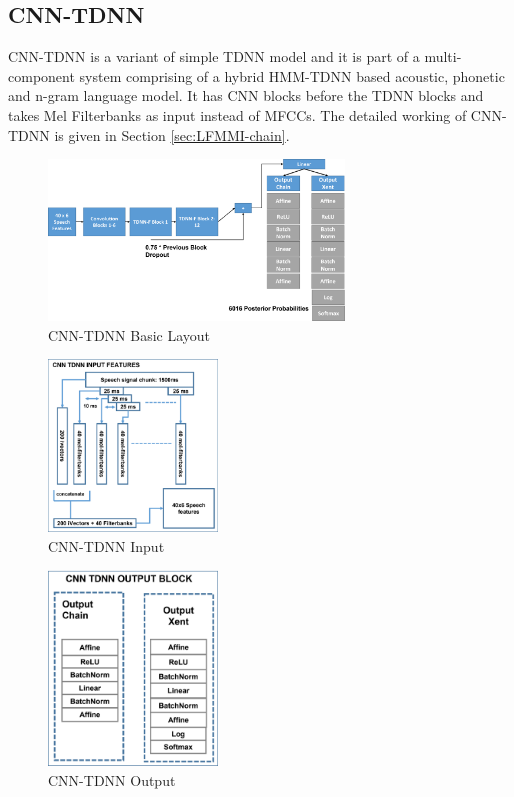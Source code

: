 \subsection{CNN-TDNN}

CNN-TDNN \cite{ghahremani_acoustic_2016} is a variant of simple TDNN model and it is part of a multi-component system comprising of a hybrid HMM-TDNN based acoustic, phonetic and n-gram language model. It has CNN blocks before the TDNN blocks and takes Mel Filterbanks as input instead of MFCCs. The detailed working of CNN-TDNN is given in Section \ref{sec:LFMMI-chain}.

\begin{figure}[htb]
    \centering
    \includegraphics[width=0.7\textwidth]{img/CNNTDNN2.png}
    \caption{CNN-TDNN Basic Layout}
    \label{fig:CNNTDNN-Layout}
\end{figure}

\begin{figure}[h!]
    \centering
    \includegraphics[width=0.4\textwidth]{img/CNNTDNN-INPUT.png}
    \caption{CNN-TDNN Input}
    \label{fig:CNN-TDNN-INPUT}
\end{figure}



\begin{figure}[h!]
    \centering
    \includegraphics[width=0.4\textwidth]{img/CNNTDNNOUTPUT.png}
    \caption{CNN-TDNN Output}
    \label{fig:CNNTDNN-output}
\end{figure}

